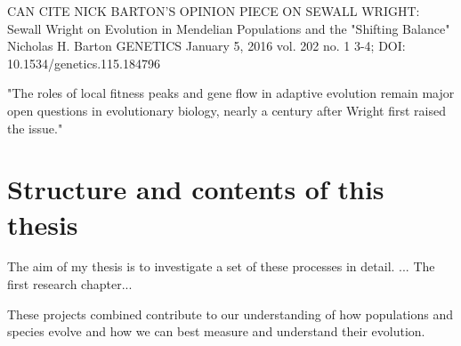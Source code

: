 CAN CITE NICK BARTON'S OPINION PIECE ON SEWALL WRIGHT:
Sewall Wright on Evolution in Mendelian Populations and the "Shifting Balance"
Nicholas H. Barton
GENETICS January 5, 2016 vol. 202 no. 1 3-4; DOI: 10.1534/genetics.115.184796

"The roles of local fitness peaks and gene flow in adaptive
evolution remain major open questions in evolutionary biology,
nearly a century after Wright first raised the issue."

\section{Structure and contents of this thesis}

The aim of my thesis is to investigate a set of these processes in detail.  ... 
The first research chapter...

These projects combined contribute to our understanding of how populations and species evolve 
and how we can best measure and understand their evolution.




